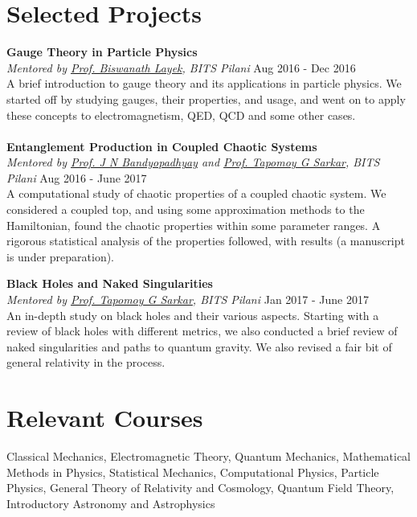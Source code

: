 \documentclass[margin, centered]{res}
\begin{document}
\begin{resume}
\section{Selected Projects}

\textbf{Gauge Theory in Particle Physics}\\
\emph{Mentored by \href{http://universe.bits-pilani.ac.in/pilani/layek/profile}{Prof. Biswanath Layek}, BITS Pilani} \hfill Aug 2016 - Dec 2016\\
A brief introduction to gauge theory and its applications in particle physics. We started off by studying gauges, their properties, and usage, and went on to apply these concepts to electromagnetism, QED, QCD and some other cases. \\
\\
\textbf{Entanglement Production in Coupled Chaotic Systems}\\
\emph{Mentored by \href{http://www.bits-pilani.ac.in/Pilani/jayendra/Profile}{Prof. J N Bandyopadhyay} and \href{http://www.bits-pilani.ac.in/Pilani/tapomoy/Profile}{Prof. Tapomoy G Sarkar}, BITS Pilani} \hfill Aug 2016 - June 2017\\
A computational study of chaotic properties of a coupled chaotic system. We considered a coupled top, and using some approximation methods to the Hamiltonian, found the chaotic properties within some parameter ranges. A rigorous statistical analysis of the properties followed, with results (a manuscript is under preparation).

\textbf{Black Holes and Naked Singularities}\\
\emph{Mentored by \href{http://www.bits-pilani.ac.in/Pilani/tapomoy/Profile}{Prof. Tapomoy G Sarkar}, BITS Pilani} \hfill Jan 2017 - June 2017\\
An in-depth study on black holes and their various aspects. Starting with a review of black holes with different metrics, we also conducted a brief review of naked singularities and paths to quantum gravity. We also revised a fair bit of general relativity in the process.


\section{Relevant \hspace{2mm} Courses}
Classical Mechanics, Electromagnetic Theory, Quantum Mechanics, Mathematical Methods in Physics, Statistical Mechanics, Computational Physics, Particle Physics, General Theory of Relativity and Cosmology, Quantum Field Theory, Introductory Astronomy and Astrophysics


\end{resume}
\end{document}
